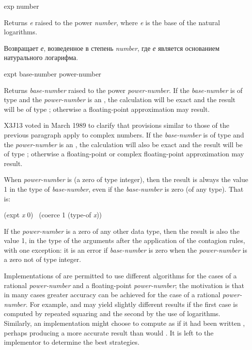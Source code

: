 \begin{defun}[Function]
exp number

Returns \emph{e} raised to the power \emph{number},
where \emph{e} is the base of the natural logarithms.

Возвращает \emph{е}, возведенное в степень \emph{number},
где \emph{е} является основанием натурального логарифма.
\end{defun}

\begin{defun}[Function]
expt base-number power-number

Returns \emph{base-number} raised to the power \emph{power-number}.
If the \emph{base-number} is of type  and the \emph{power-number} is
an ,
the calculation will be exact and the result will be of type ;
otherwise a floating-point approximation may result.

\begin{newer}
X3J13 voted in March 1989
to clarify that provisions similar to those of the previous paragraph apply to complex
numbers.  If the \emph{base-number} is of type 
and the \emph{power-number} is
an ,
the calculation will also be exact and the result will be of type
;
otherwise a floating-point or complex floating-point approximation may result.
\end{newer}

When \emph{power-number} is  (a zero of type integer),
then the result is always the value 1 in the type of \emph{base-number},
even if the \emph{base-number} is zero (of any type).  That is:
\begin{lisp}
(expt \emph{x} 0) \EQ\ (coerce 1 (type-of \emph{x}))
\end{lisp}
If the \emph{power-number} is a zero of any other data type,
then the result is also the value 1, in the type of the arguments
after the application of the contagion rules, with one exception:
it is an error if \emph{base-number} is zero when the \emph{power-number}
is a zero not of type integer.

Implementations of  are permitted to use different algorithms
for the cases of a rational \emph{power-number} and a floating-point
\emph{power-number}; the motivation is that in many cases greater accuracy
can be achieved for the case of a rational \emph{power-number}.
For example,  and  may yield
slightly different results if the first case is computed by repeated squaring
and the second by the use of logarithms.  Similarly, an implementation
might choose to compute  as if it had
been written , perhaps producing a more accurate
result than would .  It is left to the implementor
to determine the best strategies.


\end{defun}
